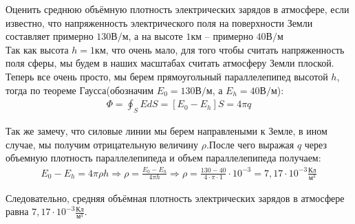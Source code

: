 \documentclass[__main__.tex]{subfiles}
\begin{document}
Оценить среднюю объёмную плотность электрических зарядов в атмосфере, если известно, что напряженность электрического поля на поверхности Земли составляет примерно $130\text{В/м}$, а на высоте $1\text{км}$ -- примерно $40\text{В/м}$\\ 

Так как высота $h=1$км, что очень мало, для того чтобы считать напряженность поля сферы, мы будем в наших масштабах считать атмосферу Земли плоской. Теперь все очень просто, мы берем прямоугольный параллелепипед высотой $h$, тогда по теореме Гаусса(обозначим $E_0 = 130\text{В/м}$, а $E_h = 40\text{В/м}$):\\
\begin{gather}
\Phi = \oint_S EdS = [E_0-E_h]S = 4\pi q 
\end{gather}

Так же замечу, что силовые линии мы берем направлеными к Земле, в ином случае, мы получим отрицательную величину $\rho$.После чего выражая $q$ через объемную плотность параллелепипеда и объем параллелепипеда получаем:\\
\begin{gather}
E_0 - E_h = 4\pi \rho h \Longrightarrow \rho = \frac{E_0 - E_h}{4\pi h} \Longrightarrow \rho = \frac{130 - 40}{4 \cdot \pi \cdot 1}\cdot10^{-3} = 7,17\cdot10^{-3} \frac{\text{Кл}}{\text{м}^3}
\end{gather}

Следовательно, средняя объёмная плотность электрических зарядов в атмосфере равна $7,17\cdot10^{-3} \frac{\text{Кл}}{\text{м}^3}$.
\end{document}
